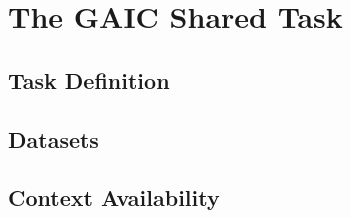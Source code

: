 
\chapter{The GAIC Shared Task}
\label{ch:gaic_task}


\section{Task Definition}
\label{sec:task_definition}


\section{Datasets}
\label{sec:datasets}


\section{Context Availability}
\label{sec:context_availability}

